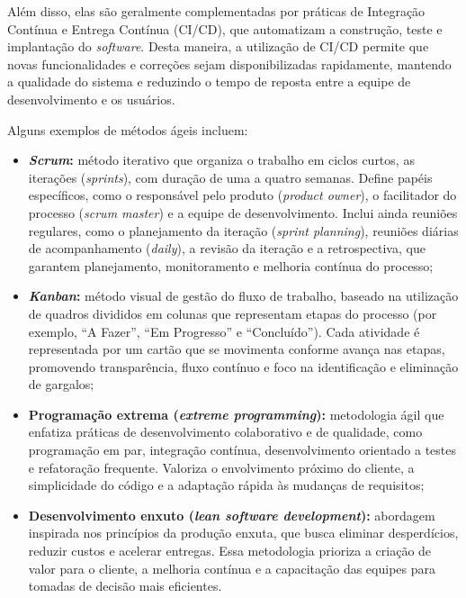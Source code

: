 Além disso, elas são geralmente complementadas por práticas de Integração Contínua e Entrega Contínua (CI/CD), que automatizam a construção, teste e implantação do \emph{software}. Desta maneira, a utilização de CI/CD permite que novas funcionalidades e correções sejam disponibilizadas rapidamente, mantendo a qualidade do sistema e reduzindo o tempo de reposta entre a equipe de desenvolvimento e os usuários.

Alguns exemplos de métodos ágeis incluem:
\begin{itemize}
    \item \textbf{\emph{Scrum}:} método iterativo que organiza o trabalho em ciclos curtos, as iterações (\emph{sprints}), com duração de uma a quatro semanas. Define papéis específicos, como o responsável pelo produto (\emph{product owner}), o facilitador do processo (\emph{scrum master}) e a equipe de desenvolvimento. Inclui ainda reuniões regulares, como o planejamento da iteração (\emph{sprint planning}), reuniões diárias de acompanhamento (\emph{daily}), a revisão da iteração e a retrospectiva, que garantem planejamento, monitoramento e melhoria contínua do processo;

    \item \textbf{\emph{Kanban}:} método visual de gestão do fluxo de trabalho, baseado na utilização de quadros divididos em colunas que representam etapas do processo (por exemplo, ``A Fazer'', ``Em Progresso'' e ``Concluído''). Cada atividade é representada por um cartão que se movimenta conforme avança nas etapas, promovendo transparência, fluxo contínuo e foco na identificação e eliminação de gargalos;

    \item \textbf{Programação extrema (\emph{extreme programming}):} metodologia ágil que enfatiza práticas de desenvolvimento colaborativo e de qualidade, como programação em par, integração contínua, desenvolvimento orientado a testes e refatoração frequente. Valoriza o envolvimento próximo do cliente, a simplicidade do código e a adaptação rápida às mudanças de requisitos;

    \item \textbf{Desenvolvimento enxuto (\emph{lean software development}):} abordagem inspirada nos princípios da produção enxuta, que busca eliminar desperdícios, reduzir custos e acelerar entregas. Essa metodologia prioriza a criação de valor para o cliente, a melhoria contínua e a capacitação das equipes para tomadas de decisão mais eficientes.
\end{itemize}

